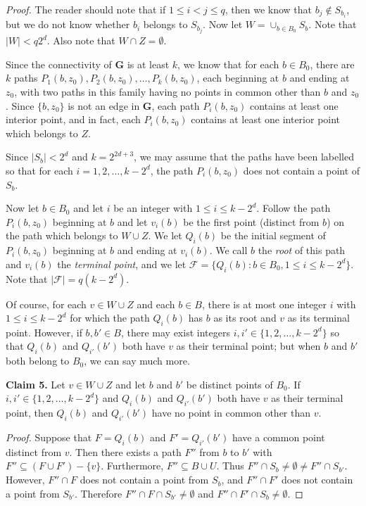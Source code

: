 \documentclass{amsart}
\theoremstyle{remark}
\newcommand{\bfG}{\mathbf{G}}
\begin{document}
\begin{proof}
\medskip
The reader should note that if $1\le i < j\le q$, then
we know that $b_j\not\in S_{b_i}$, but
we do not know whether $b_i$ belongs to $S_{b_j}$.
Now let $W= \cup_{b\in B_0}S_b$.  Note that $|W|<
q2^d$.  Also note that $W\cap Z=\emptyset$.

Since the connectivity of $\bfG$ is at least $k$, we know
that for each $b\in B_0$, there are
$k$ paths $P_1(b,z_0), P_2(b,z_0),\ldots, P_k(b,z_0)$, each beginning
at $b$ and ending at $z_0$, with two paths in this family having
no points in common other than $b$ and $z_0$.  
Since $\{b,z_0\}$ is not an edge in $\bfG$,
each path $P_i(b,z_0)$ contains at least one interior point,
and in fact, each $P_i(b,z_0)$ contains at least one interior point 
which belongs to $Z$. 

Since $|S_b|<2^d$ and $k=2^{2d+3}$, we may assume that
the paths have been labelled so that
for each $i=1,2,\dots,k-2^d$, the path $P_i(b,z_0)$ does not
contain a point of $S_b$. 

Now let $b\in B_0$ and let $i$ be an integer with $1\le i\le k-2^d$.
Follow the path $P_i(b,z_0)$ beginning at $b$ and let $v_i(b)$ be the first
point (distinct from $b$) on the path which belongs to $W\cup Z$.
We let $Q_i(b)$ be the initial segment
of $P_i(b,z_0)$ beginning at $b$ and ending at $v_i(b)$.
We call $b$ the \textit{root} of this path and
$v_i(b)$ the \textit{terminal point},
and we let $\mathcal{F}=\{Q_i(b):b\in B_0, 1\le i\le k-2^d\}$.
Note that $|\mathcal{F}|=q(k-2^d)$.

Of course, for each $v\in W\cup Z$ and each $b\in B$, there
is at most one integer $i$ with $1\le i\le k-2^d$ for
which the path $Q_i(b)$ has $b$ as its root and
$v$ as its terminal point.  However, if $b,b'\in B$, there may
exist integers $i,i'\in\{1,2,\dots,k-2^d\}$ so that
$Q_i(b)$ and $Q_{i'}(b')$ both have $v$ as their terminal point;
but when $b$ and $b'$ both belong to $B_0$, we can say much more.

\medskip
\noindent\textbf{Claim 5.} 
Let $v\in W\cup Z$ and let $b$ and $b'$ be distinct 
points of $B_0$.  If $i,i'\in\{1,2,\dots,k-2^d\}$ and
$Q_i(b)$ and $Q_{i'}(b')$ both have $v$ as their terminal point,
then $Q_i(b)$ and $Q_{i'}(b')$ have no point in common other
than $v$. 

\medskip
\noindent
\textit{Proof.}  
Suppose that $F =Q_i(b)$ and $F'=Q_{i'}(b')$ have 
a common point distinct from $v$.  Then there exists a path $F''$ 
from $b$ to $b'$ with $F''\subseteq (F\cup F')-\{v\}$.  
Furthermore, $F''\subseteq B\cup U$.
Thus $F''\cap S_{b}\neq\emptyset\neq F''\cap S_{b'}$.  However,
$F''\cap F$ does not contain a point from $S_{b}$, and
$F''\cap F'$ does not contain a point from $S_{b'}$.
Therefore $F''\cap F\cap S_{b'}\neq\emptyset$ and 
$F''\cap F'\cap S_{b}\neq\emptyset$.  


\end{proof}
\end{document}
